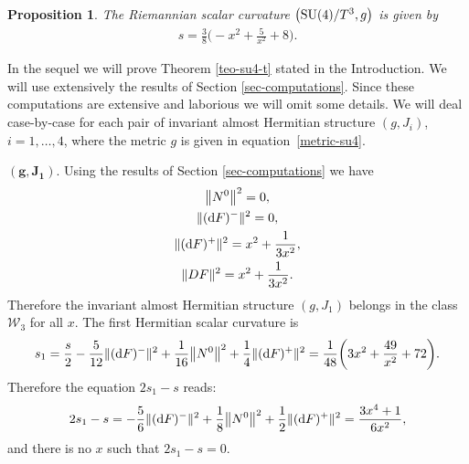 \documentclass[pdftex]{sigma}%
\numberwithin{equation}{section}
\newtheorem{Proposition}[Theorem]{Proposition}
 { \theoremstyle{definition}
\newtheorem{Definition}[Theorem]{Definition}
\newtheorem{Question}[Theorem]{Question}
\newtheorem*{Notation}{Notation}
\newtheorem{Example}[Theorem]{Example}
\newtheorem{Remark}[Theorem]{Remark} }
\begin{document}
\begin{Proposition}
The Riemannian scalar curvature $\big({\rm SU}(4)/T^3,g\big)$ is given by
\begin{gather*}
s=\frac{3}{8} \bigg({-}x^2+\frac{5}{x^2}+8\bigg).
\end{gather*}
\end{Proposition}

In the sequel we will prove Theorem \ref{teo-su4-t} stated in the Introduction. We will use extensively the results of Section \ref{sec-computations}. Since these computations are extensive and laborious we will omit some details. We will deal case-by-case for each pair of invariant almost Hermitian structure $(g,J_i)$, $i=1,\ldots, 4$, where the metric $g$ is given in equation~\eqref{metric-su4}.

\medskip\noindent
$\boldsymbol{(g, J_{1}).}$ Using the results of Section \ref{sec-computations} we have
\begin{gather*}
\big\|N^{0}\big\|^{2}=0,\\
\|({\rm d}F)^{-}\|^{2}=0,\\
\|({\rm d}F)^{+}\|^{2}=x^2+\frac{1}{3 x^2},\\
\|DF\|^{2}=x^2+\frac{1}{3 x^2}.
\end{gather*}
Therefore the invariant almost Hermitian structure $(g,J_1)$ belongs in the class $\mathcal{W}_{3}$ for all $x$.
The first Hermitian scalar curvature is
\begin{align*}
s_{1}=\dfrac{s}{2}-\dfrac{5}{12}\|({\rm d}F)^{-}\|^{2}+\dfrac{1}{16}\big\|N^{0}\big\|^{2}+\dfrac{1}{4}\|({\rm d}F)^{+}\|^{2}
=\frac{1}{48} \bigg(3 x^2+\frac{49}{x^2}+72\bigg).
\end{align*}
Therefore the equation $2s_{1}-s$ reads:
\begin{align*}
2s_{1}-s=-\dfrac{5}{6}\|({\rm d}F)^{-}\|^{2}+\dfrac{1}{8}\big\|N^{0}\big\|^{2}+\dfrac{1}{2}\|({\rm d}F)^{+}\|^{2}
=\frac{3 x^4+1}{6 x^2},
\end{align*}
and there is no $x$ such that $2s_{1}-s=0$.
\end{document}
